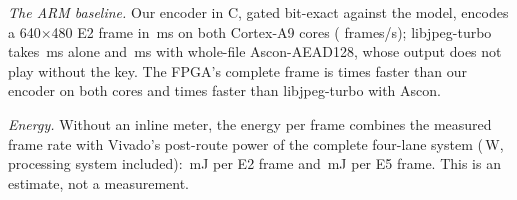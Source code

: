 \textit{The ARM baseline.} Our encoder in C, gated bit-exact against the model, encodes a 640$\times$480 E2 frame in \BdArmOursTwoMs\,ms on both Cortex-A9 cores (\BdArmOursTwoFps{} frames/s); libjpeg-turbo takes \BdArmTurboMs\,ms alone and \BdArmTurboAsconMs\,ms with whole-file Ascon-AEAD128, whose output does not play without the key. The FPGA's complete frame is \BdSpeedupFrame{} times faster than our encoder on both cores and \BdSpeedupTurboAscon{} times faster than libjpeg-turbo with Ascon.

\textit{Energy.} Without an inline meter, the energy per frame combines the measured frame rate with Vivado's post-route power of the complete four-lane system (\BdPowerEstW\,W, processing system included): \BdEnergyEtwoMj\,mJ per E2 frame and \BdEnergyEfiveMj\,mJ per E5 frame. This is an estimate, not a measurement.
